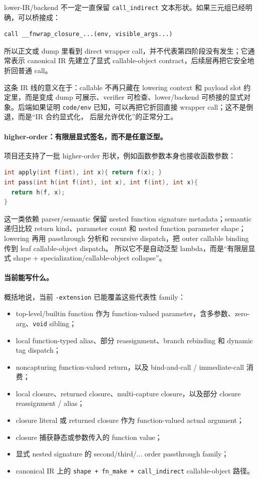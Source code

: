 \documentclass[UTF8,a4paper,11pt]{ctexart}
\begin{document}
lower-IR/backend 不一定一直保留 \texttt{call\_indirect} 文本形状。如果三元组已经明确，可以桥接成：

\begin{lstlisting}[language={}]
call __fnwrap_closure_...(env, visible_args...)
\end{lstlisting}

所以正文或 dump 里看到 direct wrapper call，并不代表第四阶段没有发生；它通常表示 canonical IR
先建立了显式 callable-object contract，后续层再把它安全地折回普通 call。

这条 IR 线的意义在于：callable 不再只藏在 lowering context 和 payload slot 约定里，而是变成
dump 可展示、verifier 可检查、lower/backend 可桥接的显式对象。后端如果证明
\texttt{code/env} 已知，可以再把它折回直接 wrapper call；这不是倒退，而是“IR 合约显式化，
后层允许优化”的正常分工。

\paragraph{higher-order：有限层显式签名，而不是任意泛型。}
项目还支持了一批 higher-order 形状，例如函数参数本身也接收函数参数：

\begin{lstlisting}[language=C]
int apply(int f(int), int x){ return f(x); }
int pass(int h(int f(int), int x), int f(int), int x){
  return h(f, x);
}
\end{lstlisting}

这一类依赖 parser/semantic 保留 nested function signature metadata；semantic 递归比较
return kind、parameter count 和 nested function parameter shape；lowering 再用 passthrough
分析和 recursive dispatch，把 outer callable binding 传到 leaf callable-object dispatch。
所以它不是自动泛型 lambda，而是“有限层显式 shape + specialization/callable-object collapse”。

\paragraph{当前能写什么。}
概括地说，当前 \texttt{-extension} 已能覆盖这些代表性 family：

\begin{itemize}
  \item top-level/builtin function 作为 function-valued parameter，含多参数、zero-arg、\texttt{void} sibling；
  \item local function-typed alias、部分 reassignment、branch rebinding 和 dynamic tag dispatch；
  \item noncapturing function-valued return，以及 bind-and-call / immediate-call 消费；
  \item local closure、returned closure、multi-capture closure，以及部分 closure reassignment / alias；
  \item closure literal 或 returned closure 作为 function-valued actual argument；
  \item closure 捕获静态或参数传入的 function value；
  \item 显式 nested signature 的 second/third/... order passthrough family；
  \item canonical IR 上的 \texttt{shape + fn\_make + call\_indirect} callable-object 路径。
\end{itemize}
\end{document}
